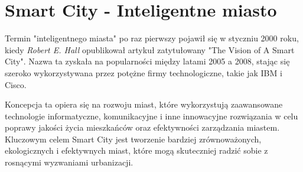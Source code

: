 \section{Smart City - Inteligentne miasto}

\par Termin "inteligentnego miasta" po raz pierwszy pojawił się w styczniu 2000 roku, kiedy \emph{Robert E. Hall}\cite{THE_VISION_OF_A_SMART_CITY} opublikował artykuł zatytułowany "The Vision of A Smart City". Nazwa ta zyskała na popularności między latami 2005 a 2008, stając się szeroko wykorzystywana przez potężne firmy technologiczne, takie jak IBM i Cisco.

\par Koncepcja ta opiera się na rozwoju miast, które wykorzystują zaawansowane technologie informatyczne, komunikacyjne i inne innowacyjne rozwiązania w celu poprawy jakości życia mieszkańców oraz efektywności zarządzania miastem. Kluczowym celem Smart City jest tworzenie bardziej zrównoważonych, ekologicznych i efektywnych miast, które mogą skuteczniej radzić sobie z rosnącymi wyzwaniami urbanizacji.

